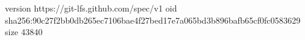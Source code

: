 version https://git-lfs.github.com/spec/v1
oid sha256:90c27f2bb0db265ec7106bae4f27bed17e7a065bd3b896bafb65cf0fc0583629
size 43840

